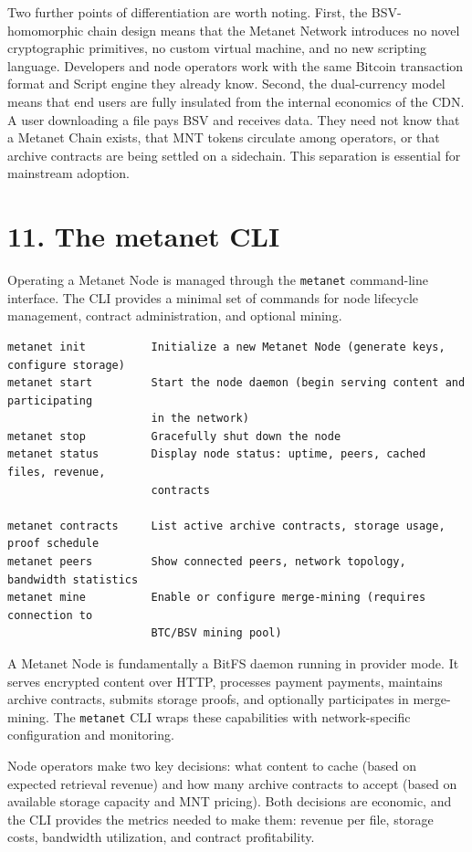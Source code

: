 \documentclass[11pt,a4paper]{article}
\begin{document}
Two further points of differentiation are worth noting. First, the BSV-homomorphic chain design means that the Metanet Network introduces no novel cryptographic primitives, no custom virtual machine, and no new scripting language. Developers and node operators work with the same Bitcoin transaction format and Script engine they already know. Second, the dual-currency model means that end users are fully insulated from the internal economics of the CDN. A user downloading a file pays BSV and receives data. They need not know that a Metanet Chain exists, that MNT tokens circulate among operators, or that archive contracts are being settled on a sidechain. This separation is essential for mainstream adoption.

\section{11. The metanet CLI}

Operating a Metanet Node is managed through the \texttt{metanet} command-line interface. The CLI provides a minimal set of commands for node lifecycle management, contract administration, and optional mining.

\begin{lstlisting}
metanet init          Initialize a new Metanet Node (generate keys, configure storage)
metanet start         Start the node daemon (begin serving content and participating
                      in the network)
metanet stop          Gracefully shut down the node
metanet status        Display node status: uptime, peers, cached files, revenue,
                      contracts

metanet contracts     List active archive contracts, storage usage, proof schedule
metanet peers         Show connected peers, network topology, bandwidth statistics
metanet mine          Enable or configure merge-mining (requires connection to
                      BTC/BSV mining pool)
\end{lstlisting}

A Metanet Node is fundamentally a BitFS daemon running in provider mode. It serves encrypted content over HTTP, processes payment payments, maintains archive contracts, submits storage proofs, and optionally participates in merge-mining. The \texttt{metanet} CLI wraps these capabilities with network-specific configuration and monitoring.

Node operators make two key decisions: what content to cache (based on expected retrieval revenue) and how many archive contracts to accept (based on available storage capacity and MNT pricing). Both decisions are economic, and the CLI provides the metrics needed to make them: revenue per file, storage costs, bandwidth utilization, and contract profitability.
\end{document}
